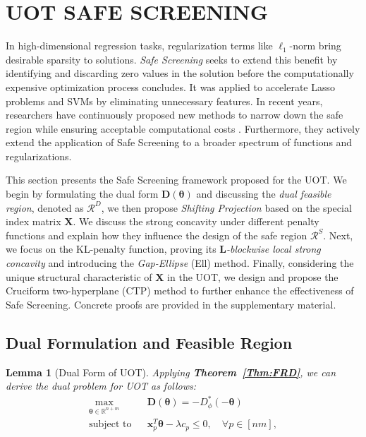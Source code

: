 \documentclass[11pt]{article}
\newtheorem{lem}[thm]{Lemma}
\newcommand{\R}{\mathbb{R}}
\newcommand{\mat}[1]{\mathbf{#1}}
\renewcommand{\vec}[1]{\bm{#1}}
\begin{document}
\section{UOT SAFE SCREENING}
\label{sec:pro}

In high-dimensional regression tasks, regularization terms like $\ell_1$-norm bring desirable sparsity to solutions. {\it Safe Screening} seeks to extend this benefit by identifying and discarding zero values in the solution before the computationally expensive optimization process concludes. It was applied to accelerate Lasso problems \cite{ghaoui2010safe} and SVMs \cite{Ogawa_ICML_2013} by eliminating unnecessary features. In recent years, researchers have continuously proposed new methods to narrow down the safe region while ensuring acceptable computational costs \cite{Liu_ICML_2014,Wang_JMLR_2015, JMLR:v18:16-577, Yamada_NIPS_2021}. Furthermore, they actively extend the application of Safe Screening to a broader spectrum of functions and regularizations. \cite{DBLP:conf/icml/AtamturkG20, Dantas_ICASSP_2021, 10.5555/3546258.3546494}


This section presents the Safe Screening framework proposed for the UOT. We begin by formulating the dual form $\mat D(\vec \theta)$ and discussing the {\it dual feasible region}, denoted as $\mathcal{R}^D$, we then propose {\it Shifting Projection} based on the special index matrix $\mat X$. We discuss the strong concavity under different penalty functions and explain how they influence the design of the safe region $\mathcal{R}^{S}$. Next, we focus on the KL-penalty function, proving its {\it $\mat L$-blockwise local strong concavity} and introducing the {\it Gap-Ellipse} (Ell) method. Finally, considering the unique structural characteristic of $\mat X$ in the UOT, we design and propose the Cruciform two-hyperplane (CTP) method to further enhance the effectiveness of Safe Screening. Concrete proofs are provided in the supplementary material.

\subsection{Dual Formulation and Feasible Region}
%
\begin{lem}[Dual Form of UOT]
\label{Lem:alluotdual}
Applying {\bf Theorem~\ref{Thm:FRD}}, we can derive the dual problem for UOT as follows:
%
\begin{eqnarray}
\max_{\vec{\theta} \in \R^{n+m}} &\!\!\!&\mat D(\vec \theta) = -\displaystyle{D_{\phi}^*(-\vec{\theta})}  \nonumber \\ 
\text{subject\ to}&\!\!\!&\vec{x}_p^T\vec{\theta} -\lambda c_p \leq 0, \quad \forall p \in [nm],
\label{eq:alluotdual}
\end{eqnarray}
%
\end{lem}
\end{document}
